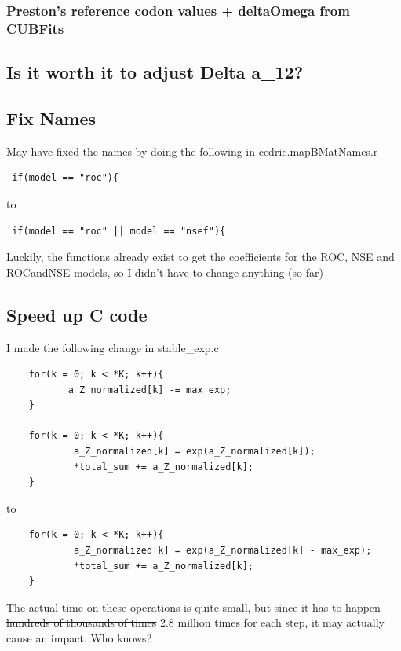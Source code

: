 \subsubsection{Preston's reference codon values + deltaOmega from CUBFits}

\subsection{Is it worth it to adjust Delta a\_12?}

\subsection{Fix Names}

May have fixed the names by doing the following in cedric.mapBMatNames.r

\begin{verbatim}
 if(model == "roc"){
\end{verbatim}

to

\begin{verbatim}
 if(model == "roc" || model == "nsef"){
\end{verbatim}

Luckily, the functions already exist to get the coefficients for the ROC, NSE and ROCandNSE models, so I didn't have to change anything (so far)

\subsection{Speed up C code}

I made the following change in stable\_exp.c

\begin{verbatim}
	for(k = 0; k < *K; k++){
	       a_Z_normalized[k] -= max_exp;
	}

	for(k = 0; k < *K; k++){
	        a_Z_normalized[k] = exp(a_Z_normalized[k]);
	        *total_sum += a_Z_normalized[k];
	}
\end{verbatim}

to

\begin{verbatim}
	for(k = 0; k < *K; k++){
	        a_Z_normalized[k] = exp(a_Z_normalized[k] - max_exp);
	        *total_sum += a_Z_normalized[k];
	}
\end{verbatim}

The actual time on these operations is quite small, but since it has to happen \sout{hundreds of thousands of times} 2.8 million times for each step, it may actually cause an impact. Who knows?

